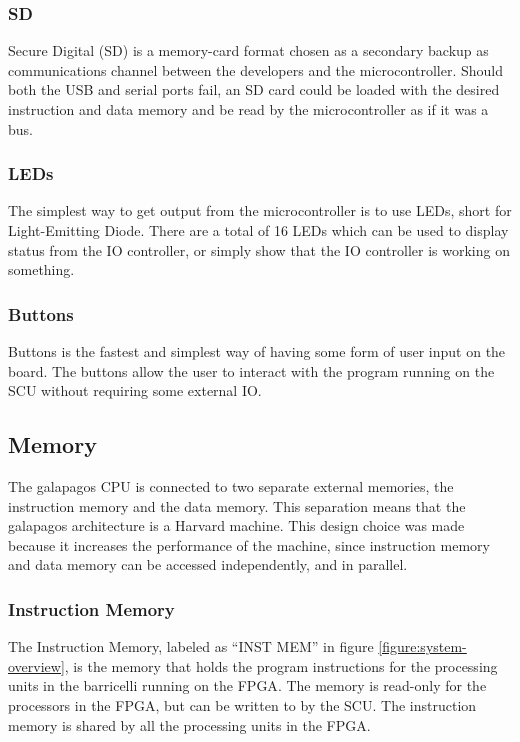 \subsubsection{SD}

Secure Digital (SD) is a memory-card format chosen as a secondary backup as communications channel between the developers and the microcontroller.
Should both the USB and serial ports fail, an SD card could be loaded with the desired instruction and data memory and be read by the microcontroller as if it was a bus.

\subsubsection{LEDs}

The simplest way to get output from the microcontroller is to use LEDs, short for Light-Emitting Diode.
There are a total of 16 LEDs which can be used to display status from the IO controller, or simply show that the IO controller is working on something.

\subsubsection{Buttons}

Buttons is the fastest and simplest way of having some form of user input on the board.
The buttons allow the user to interact with the program running on the SCU without requiring some external IO.

\subsection{Memory}

The \Gls{galapagos} CPU is connected to two separate external memories, the instruction memory and the data memory.
This separation means that the \Gls{galapagos} architecture is a Harvard machine.
This design choice was made because it increases the performance of the machine, since instruction memory and data memory can be accessed independently, and in parallel. 

\subsubsection{Instruction Memory}

The Instruction Memory, labeled as ``INST MEM'' in figure \vref{figure:system-overview}, is the memory that holds the program instructions for the processing units in the \Gls{barricelli} running on the \gls{FPGA}.
The memory is read-only for the processors in the \gls{FPGA}, but can be written to by the \gls{SCU}.
The instruction memory is shared by all the processing units in the \gls{FPGA}.

